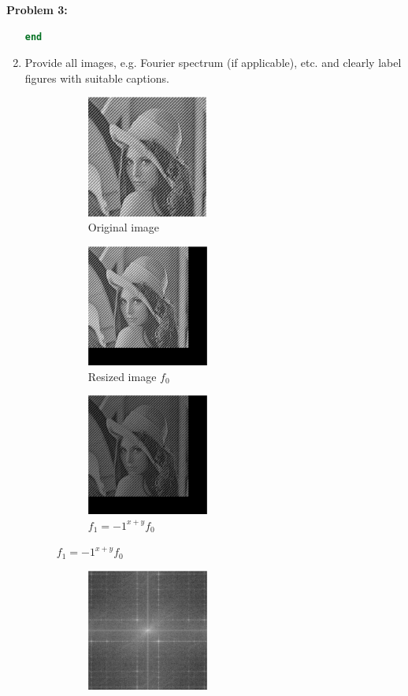 \documentclass[11pt]{article}
\newenvironment{problem}[1]{\textbf{Problem #1: }}{\newpage}
\begin{document}
\begin{problem}{3}
\begin{enumerate}[label = (\alph*)]
\begin{lstlisting}[language=Matlab]
end
\end{lstlisting}
			\newpage
			\item Provide all images, e.g. Fourier spectrum (if applicable), etc. and clearly label figures with suitable captions.
			\begin{figure}[h!]
				\centering
				\begin{subfigure}[h!]{.3\textwidth}
					\centering
					\includegraphics[height = 4cm]{Figures/Prob3/1}
					\caption{Original image}
				\end{subfigure}
				\begin{subfigure}[h!]{.3\textwidth}
					\centering
					\includegraphics[height = 4cm]{Figures/Prob3/2}
					\caption{Resized image $f_0$}
				\end{subfigure}
				\begin{subfigure}[h!]{.3\textwidth}
					\centering
					\includegraphics[height = 4cm]{Figures/Prob3/3}
					\caption{$f_1 = -1^{x+y}f_0$}
				\end{subfigure}
			\end{figure}
			\begin{figure}[h!]
				\centering
				\begin{subfigure}[h!]{.3\textwidth}
					\centering
					\includegraphics[height = 4cm]{Figures/Prob3/4}

\end{subfigure}
\end{figure}
\end{enumerate}
\end{problem}
\end{document}
